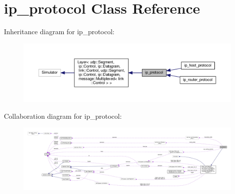 \hypertarget{classip__protocol}{}\section{ip\+\_\+protocol Class Reference}
\label{classip__protocol}


Inheritance diagram for ip\+\_\+protocol\+:\nopagebreak
\begin{figure}[H]
\begin{center}
\leavevmode
\includegraphics[width=350pt]{classip__protocol__inherit__graph}
\end{center}
\end{figure}


Collaboration diagram for ip\+\_\+protocol\+:\nopagebreak
\begin{figure}[H]
\begin{center}
\leavevmode
\includegraphics[width=350pt]{classip__protocol__coll__graph}
\end{center}
\end{figure}

